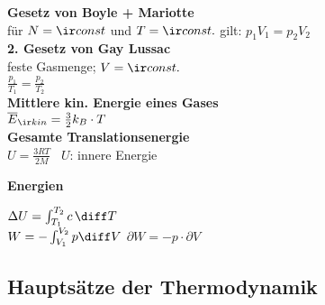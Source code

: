 \documentclass[german, 8pt]{latex4ei/latex4ei_sheet}
\begin{document}
\textbf{Gesetz von Boyle + Mariotte} \\
für $N=\ir const$ und $T=\ir const.$ gilt: $p_1V_1=p_2V_2$ \\

\textbf{2. Gesetz von Gay Lussac} \\
feste Gasmenge; $V=\ir const.$\\
$\frac{p_1}{T_1}=\frac{p_2}{T_2}$ \\

\textbf{Mittlere kin. Energie eines Gases} \\
$\overline{E}_{\ir kin}=\frac{3}{2}k_B \cdot T$ \\

\textbf{Gesamte Translationsenergie} \\
$U=\frac{3RT}{2M}$ \, $U$: innere Energie

\textbf{Energien}
\begin{sectionbox}
$\Delta U = \int_{T_1}^{T_2} c \, \diff T$\\
$W=-\int_{V_1}^{V_2} p \diff V$ \qquad $\partial W= -p \cdot \partial V$

\end{sectionbox}

\subsection{Hauptsätze der Thermodynamik}
\end{document}
